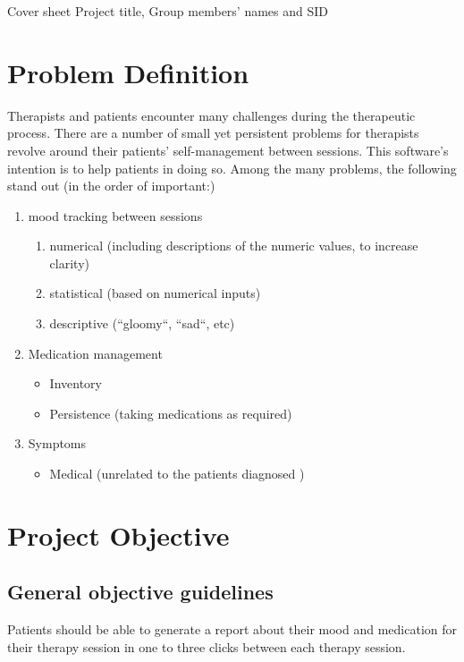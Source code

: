\documentclass[11pt]{article}
\begin{document}
    \maketitle
    Cover sheet {Project title, Group members' names and SID}


    \chapter{Problem Definition}\label{ch:problem-definition}
    Therapists and patients encounter many challenges during the therapeutic process.
    There are a number of small yet persistent problems for therapists revolve around their patients' self-management between sessions.
    This software's intention is to help patients in doing so.
    Among the many problems, the following stand out (in the order of important:)
    \begin{enumerate}
        \item mood tracking between sessions
        \begin{enumerate}
            \item numerical (including descriptions of the numeric values, to increase clarity)
            \item statistical (based on numerical inputs)
            \item descriptive (``gloomy``, ``sad``, etc)
        \end{enumerate}
        \item Medication management
        \begin{itemize}
            \item Inventory
            \item Persistence (taking medications as required)
        \end{itemize}
        \item Symptoms
        \begin{itemize}
            \item Medical (unrelated to the patients diagnosed )
        \end{itemize}
    \end{enumerate}


    \chapter{Project Objective}\label{ch:project-objective}
    \section{General objective guidelines}
	Patients should be able to generate a report about their mood and medication for their therapy session in one to three clicks between each therapy session. 
\end{document}

